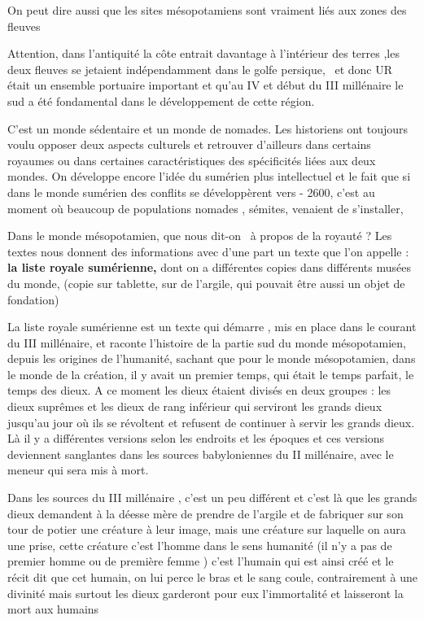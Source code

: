 \documentclass[a4paper]{article}
\begin{document}
On peut dire aussi que les sites mésopotamiens sont vraiment liés aux zones des fleuves

Attention, dans l'antiquité la côte entrait davantage à l'intérieur des terres ,les deux fleuves se jetaient
indépendamment dans le golfe persique, \ et donc UR était un ensemble portuaire important et qu'au IV et début du III
millénaire le sud a été fondamental dans le développement de cette région.


C'est un monde sédentaire et un monde de nomades. Les historiens ont toujours voulu opposer deux aspects culturels et
retrouver d'ailleurs dans certains royaumes ou dans certaines caractéristiques des spécificités liées aux deux mondes.
On développe encore l'idée du sumérien plus intellectuel et le fait que si dans le monde sumérien des conflits se
développèrent vers - 2600, c'est au moment où beaucoup de populations nomades , sémites, venaient de s'installer, 


Dans le monde mésopotamien, que nous dit-on \ à propos de la royauté ? Les textes nous donnent des informations avec
d'une part un texte que l'on appelle : \textbf{la liste royale sumérienne, }dont on a différentes copies dans
différents musées du monde, (copie sur tablette, sur de l'argile, qui pouvait être aussi un objet de fondation)

La liste royale sumérienne est un texte qui démarre , mis en place dans le courant du III millénaire, et raconte
l'histoire de la partie sud du monde mésopotamien, depuis les origines de l'humanité, sachant que pour le monde
mésopotamien, dans le monde de la création, il y avait un premier temps, qui était le temps parfait, le temps des
dieux. A ce moment les dieux étaient divisés en deux groupes : les dieux suprêmes et les dieux de rang inférieur qui
serviront les grands dieux jusqu'au jour où ils se révoltent et refusent de continuer à servir les grands dieux. Là il
y a différentes versions selon les endroits et les époques et ces versions deviennent sanglantes dans les sources
babyloniennes du II millénaire, avec le meneur qui sera mis à mort.

Dans les sources du III millénaire , c'est un peu différent et c'est là que les grands dieux demandent à la déesse mère
de prendre de l'argile et de fabriquer sur son tour de potier une créature à leur image, mais une créature sur laquelle
on aura une prise, cette créature c'est l'homme dans le sens humanité (il n'y a pas de premier homme ou de première
femme ) c'est l'humain qui est ainsi créé et le récit dit que cet humain, on lui perce le bras et le sang coule,
contrairement à une divinité mais surtout les dieux garderont pour eux l'immortalité et laisseront la mort aux humains
\end{document}

